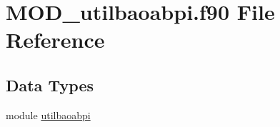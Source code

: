 \hypertarget{MOD__utilbaoabpi_8f90}{\section{M\-O\-D\-\_\-utilbaoabpi.\-f90 File Reference}
\label{MOD__utilbaoabpi_8f90}
}
\subsection*{Data Types}
\begin{DoxyCompactItemize}
\item 
module \hyperlink{classutilbaoabpi}{utilbaoabpi}
\end{DoxyCompactItemize}
